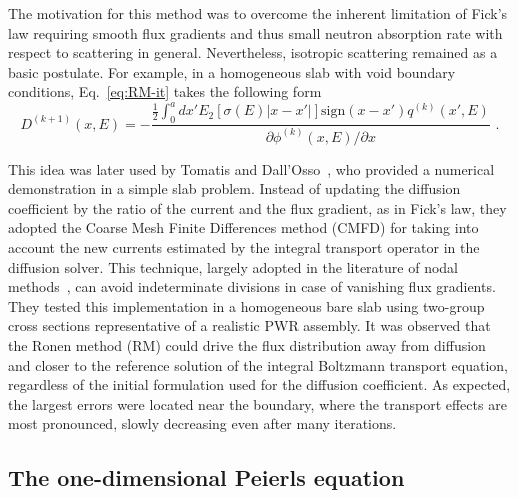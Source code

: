 The motivation for this method was to overcome the inherent limitation of Fick's law requiring smooth flux gradients and thus small neutron absorption rate with respect to scattering in general. Nevertheless, isotropic scattering remained as a basic postulate.
For example, in a homogeneous slab with void boundary conditions, Eq.~\eqref{eq:RM-it} takes the following form~\cite{Ronen-2004} 
\begin{equation}\label{eq:RM-it-1D-slab}
D^{(k+1)}(x,E) = -\frac{\frac{1}{2}\int_0^a dx' E_2[\sigma(E)\lvert
	x-x'\rvert]\text{sign}(x-x')q^{(k)}(x',E)}
{\partial \phi^{(k)}(x,E)/\partial x} \,\, .
\end{equation}

This idea was later used by Tomatis and Dall'Osso~\cite{Tomatis-2011}, who provided a numerical demonstration in a simple slab problem. Instead of updating the diffusion coefficient by the ratio of the current and the flux gradient, as in Fick's law, they adopted the Coarse Mesh Finite Differences method (CMFD) for taking into account the new currents estimated by the integral transport operator in the diffusion solver. 
%
%
This technique, largely adopted in the literature of nodal methods~\cite{Smith-1983,Lawrence-1986}, can avoid indeterminate divisions in case of vanishing flux gradients. They tested this implementation in a homogeneous bare slab using two-group cross sections representative of a realistic PWR assembly. It was observed that the Ronen method (RM) could drive the flux distribution away from diffusion and closer to the reference solution of the integral Boltzmann transport equation, regardless of the initial formulation used for the diffusion coefficient. As expected, the largest errors were located near the boundary, where the transport effects are most pronounced, slowly decreasing even after many iterations.%

%
\subsection{The one-dimensional Peierls equation}
\label{sec:Peierls}

